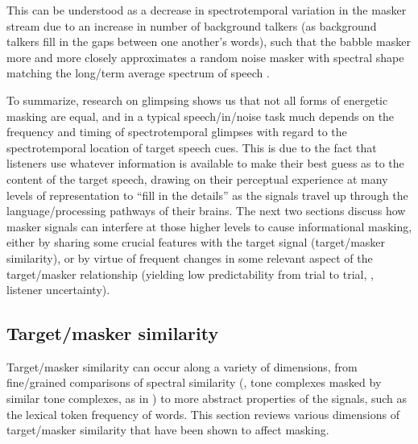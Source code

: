 This can be understood as a decrease in spectrotemporal variation in the masker stream due to an increase in number of background talkers (as background talkers fill in the gaps between one another’s words), such that the babble masker more and more closely approximates a random noise masker with spectral shape matching the long\-/term average spectrum of speech \citep{SimpsonCooke2005}.

To summarize, research on glimpsing shows us that not all forms of energetic masking are equal, and in a typical speech\-/in\-/noise task much depends on the frequency and timing of spectrotemporal glimpses with regard to the spectrotemporal location of target speech cues.  This is due to the fact that listeners use whatever information is available to make their best guess as to the content of the target speech, drawing on their perceptual experience at many levels of representation to “fill in the details” as the signals travel up through the language\-/processing pathways of their brains.  The next two sections discuss how masker signals can interfere at those higher levels to cause informational masking, either by sharing some crucial features with the target signal (target\-/masker similarity), or by virtue of frequent changes in some relevant aspect of the target\-/masker relationship (yielding low predictability from trial to trial, \ie, listener uncertainty).

\subsection{Target\-/masker similarity\label{sec:Similarity}}
Target\-/masker similarity can occur along a variety of dimensions, from fine\-/grained comparisons of spectral similarity (\eg, tone complexes masked by similar tone complexes, as in \citealt{LeeRichards2011}) to more abstract properties of the signals, such as the lexical token frequency of words.  This section reviews various dimensions of target\-/masker similarity that have been shown to affect masking.

